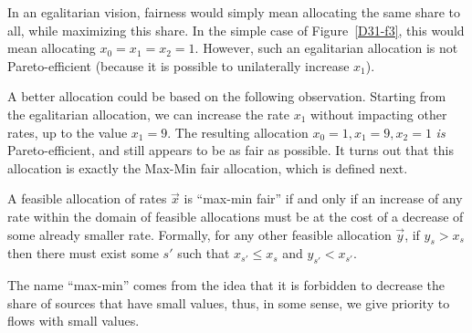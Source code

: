 

In an egalitarian vision, fairness would simply mean allocating the same
share to all, while maximizing this share. In the simple case of Figure~\ref{D31-f3}, this would
mean allocating $x_0=x_1=x_2=1$. However, such an egalitarian allocation is not Pareto-efficient (because it is possible to unilaterally increase $x_1$).

A better allocation could be based on the following observation. Starting from the egalitarian allocation, we can increase the rate $x_1$ without impacting other rates, up to the value $x_1=9$. The resulting allocation $x_0=1, x_1=9, x_2=1$ \emph{is} Pareto-efficient, and still appears to be as fair as possible. It turns out that this allocation is exactly the Max-Min fair allocation, which is defined next.



\begin{definition} A feasible allocation of rates
$\vec{x}$ is ``max-min fair'' if and only if an increase of
any rate within the domain of feasible allocations must be at
the cost of a decrease of some already smaller rate. Formally,
for any other feasible allocation $\vec{y}$, if $y_{s} >
x_{s}$ then there must exist some $s'$ such that $x_{s'} \leq
x_{s}$ and $y_{s'} < x_{s'}$. \label{def-mmf}
\end{definition}
The name
``max-min'' comes from the idea that it is forbidden to
decrease the share of sources that have small values, thus, in
some sense, we give priority to flows with small values.

